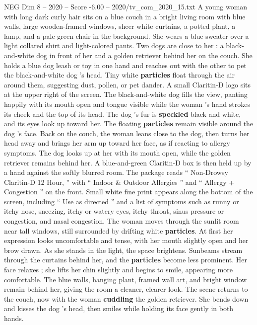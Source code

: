 \begin{textsample}{NEG Dim 8 – 2020 – Score -6.00 – 2020/tv\_com\_2020\_15.txt}  \label{ex:f8_neg_043}
A young woman with long dark curly hair sits on a blue couch in a bright living room with blue walls, large wooden-framed windows, sheer white curtains, a potted plant, a lamp, and a pale green chair in the background.
She wears a blue sweater over a light collared shirt and light-colored pants.
Two dogs are close to her : a black-and-white dog in front of her and a golden retriever behind her on the couch.
She holds a blue dog leash or toy in one hand and reaches out with the other to pet the black-and-white dog ’s head.
Tiny white \textbf{particles} float through the air around them, suggesting dust, pollen, or pet dander.
A small Claritin-D logo sits at the upper right of the screen.
The black-and-white dog fills the view, panting happily with its mouth open and tongue visible while the woman ’s hand strokes its cheek and the top of its head.
The dog ’s fur is \textbf{speckled} black and white, and its eyes look up toward her.
The floating \textbf{particles} remain visible around the dog ’s face.
Back on the couch, the woman leans close to the dog, then turns her head away and brings her arm up toward her face, as if reacting to allergy symptoms.
The dog looks up at her with its mouth open, while the golden retriever remains behind her.
A blue-and-green Claritin-D box is then held up by a hand against the softly blurred room.
The package reads “ Non-Drowsy Claritin-D 12 Hour, ” with “ Indoor \& Outdoor Allergies ” and “ Allergy + Congestion ” on the front.
Small white fine print appears along the bottom of the screen, including “ Use as directed ” and a list of symptoms such as runny or itchy nose, sneezing, itchy or watery eyes, itchy throat, sinus pressure or congestion, and nasal congestion.
The woman moves through the sunlit room near tall windows, still surrounded by drifting white \textbf{particles}.
At first her expression looks uncomfortable and tense, with her mouth slightly open and her brow drawn.
As she stands in the light, the space brightens.
Sunbeams stream through the curtains behind her, and the \textbf{particles} become less prominent.
Her face relaxes ; she lifts her chin slightly and begins to smile, appearing more comfortable.
The blue walls, hanging plant, framed wall art, and bright window remain behind her, giving the room a cleaner, clearer look.
The scene returns to the couch, now with the woman \textbf{cuddling} the golden retriever.
She bends down and kisses the dog ’s head, then smiles while holding its face gently in both hands.

\end{textsample}
